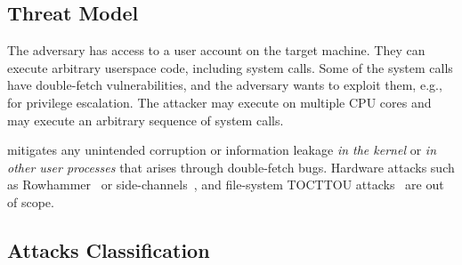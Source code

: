 \documentclass[letterpaper,twocolumn,10pt, anonymous]{article}
\begin{document}
\subsection{Threat Model}
\label{sec:threatmodel}

The adversary has access to a user account on the target machine. They can
execute arbitrary userspace code, including system calls. Some of the system 
calls have double-fetch vulnerabilities, and the adversary wants to exploit them,
e.g., for privilege escalation.
The attacker may execute on multiple CPU cores and may execute an arbitrary 
sequence of system calls. 

\tiktok mitigates any unintended corruption or information leakage \emph{in the kernel}
or \emph{in other user processes} that arises through double-fetch bugs. 
Hardware attacks such as Rowhammer~\cite{mutlu2019rowhammer}
or side-channels~\cite{kocher2019spectre}, and file-system TOCTTOU
attacks~\cite{payer2012protecting, pu2006methodical, wei2010modeling,
tsafrir2008portably} are out of scope.

\subsection{Attacks Classification}
\label{sec:attacks}
\end{document}
